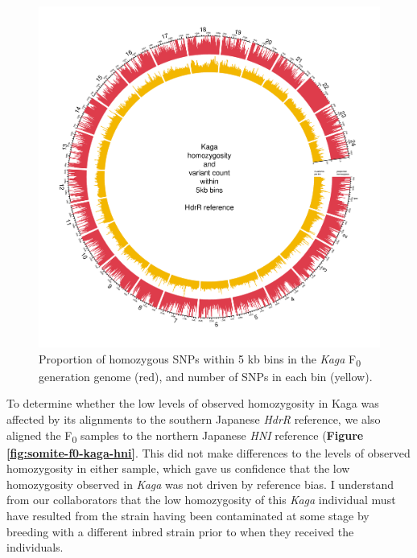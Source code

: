 \documentclass[
]{book}
\begin{document}
\begin{figure}
\includegraphics[width=1\linewidth]{figs/somites/Kaga} \caption{Proportion of homozygous SNPs within 5 kb bins in the \emph{Kaga} F\textsubscript{0} generation genome (red), and number of SNPs in each bin (yellow).}\label{fig:somite-f0-kaga}
\end{figure}

To determine whether the low levels of observed homozygosity in Kaga was affected by its alignments to the southern Japanese \emph{HdrR} reference, we also aligned the F\textsubscript{0} samples to the northern Japanese \emph{HNI} reference (\textbf{Figure \ref{fig:somite-f0-kaga-hni}}. This did not make differences to the levels of observed homozygosity in either sample, which gave us confidence that the low homozygosity observed in \emph{Kaga} was not driven by reference bias. I understand from our collaborators that the low homozygosity of this \emph{Kaga} individual must have resulted from the strain having been contaminated at some stage by breeding with a different inbred strain prior to when they received the individuals.
\end{document}

